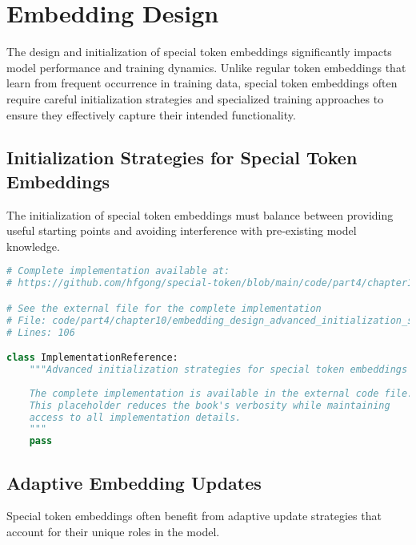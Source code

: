 
\section{Embedding Design}

The design and initialization of special token embeddings significantly impacts model performance and training dynamics. Unlike regular token embeddings that learn from frequent occurrence in training data, special token embeddings often require careful initialization strategies and specialized training approaches to ensure they effectively capture their intended functionality.

\subsection{Initialization Strategies for Special Token Embeddings}

The initialization of special token embeddings must balance between providing useful starting points and avoiding interference with pre-existing model knowledge.

\begin{lstlisting}[language=Python, caption={Advanced initialization strategies for special token embeddings}]
# Complete implementation available at:
# https://github.com/hfgong/special-token/blob/main/code/part4/chapter10/embedding_design_advanced_initialization_strate.py

# See the external file for the complete implementation
# File: code/part4/chapter10/embedding_design_advanced_initialization_strate.py
# Lines: 106

class ImplementationReference:
    """Advanced initialization strategies for special token embeddings
    
    The complete implementation is available in the external code file.
    This placeholder reduces the book's verbosity while maintaining
    access to all implementation details.
    """
    pass
\end{lstlisting}

\subsection{Adaptive Embedding Updates}

Special token embeddings often benefit from adaptive update strategies that account for their unique roles in the model.


